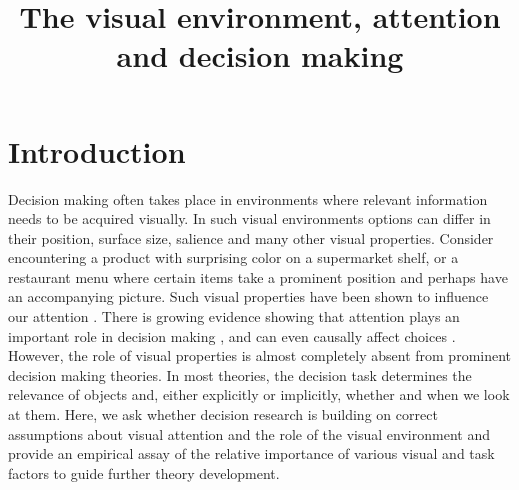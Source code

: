\documentclass[english,natbib,man,floatsintext]{apa6}
\title{The visual environment, attention and decision making}
\begin{document}
\linenumbers
\maketitle


\section{Introduction}


Decision making often takes place in environments where relevant information needs to be acquired visually. In such visual environments options can differ in their position, surface size, salience and many other visual properties. Consider encountering a product with surprising color on a supermarket shelf, or a restaurant menu where certain items take a prominent position and perhaps have an accompanying picture. Such visual properties have been shown to influence our attention \citep{corbetta2002a,borji2012a, dehaene2003a,clarke2014a,rosenholtz2007a}. There is growing evidence showing that attention plays an important role in decision making \citep{gidloef2017a,krajbich2010a,stojic2020uncertainty, callaway2019a,gluth2018, gluth2020}, and can even causally affect choices \citep{ghaffari2018a, paernamets2015a, shimojo2003a}. However, the role of visual properties is almost completely absent from prominent decision making theories. In most theories, the decision task determines the relevance of objects and, either explicitly or implicitly, whether and when we look at them. Here, we ask whether decision research is building on correct assumptions about visual attention and the role of the visual environment and provide an empirical assay of the relative importance of various visual and task factors to guide further theory development.


\end{document}
